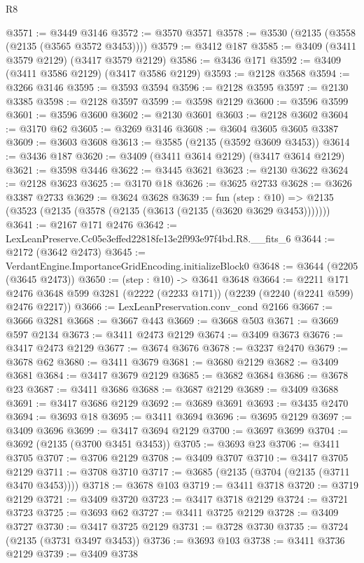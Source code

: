 \begin{lexlean}{R8}
\begin{coremodule}
@3571 := @3449 @3146
@3572 := @3570 @3571
@3578 := @3530 (@2135 (@3558 (@2135 (@3565 @3572 @3453))))
@3579 := @3412 @187
@3585 := @3409 (@3411 @3579 @2129) (@3417 @3579 @2129)
@3586 := @3436 @171
@3592 := @3409 (@3411 @3586 @2129) (@3417 @3586 @2129)
@3593 := @2128 @3568
@3594 := @3266 @3146
@3595 := @3593 @3594
@3596 := @2128 @3595
@3597 := @2130 @3385
@3598 := @2128 @3597
@3599 := @3598 @2129
@3600 := @3596 @3599
@3601 := @3596 @3600
@3602 := @2130 @3601
@3603 := @2128 @3602
@3604 := @3170 @62
@3605 := @3269 @3146
@3608 := @3604 @3605 @3605 @3387
@3609 := @3603 @3608
@3613 := @3585 (@2135 (@3592 @3609 @3453))
@3614 := @3436 @187
@3620 := @3409 (@3411 @3614 @2129) (@3417 @3614 @2129)
@3621 := @3598 @3446
@3622 := @3445 @3621
@3623 := @2130 @3622
@3624 := @2128 @3623
@3625 := @3170 @18
@3626 := @3625 @2733
@3628 := @3626 @3387 @2733
@3629 := @3624 @3628
@3639 := fun (step : @10) =>
  @2135 (@3523 (@2135 (@3578 (@2135 (@3613 (@2135 (@3620 @3629 @3453)))))))
@3641 := @2167 @171 @2476
@3642 := LexLeanPreserve.Cc05e3effed22818fe13e2f993e97f4bd.R8.__fits_6
@3644 := @2172 (@3642 @2473)
@3645 := VerdantEngine.ImportanceGridEncoding.initializeBlock0
@3648 := @3644 (@2205 (@3645 @2473))
@3650 := (step : @10) -> @3641 @3648
@3664 := @2211
    @171
    @2476
    @3648
    @599
    @3281
    (@2222 (@2233 @171))
    (@2239 (@2240 (@2241 @599) @2476 @2217))
@3666 := LexLeanPreservation.conv_cond @2166
@3667 := @3666 @3281
@3668 := @3667 @443
@3669 := @3668 @503
@3671 := @3669 @597 @2134
@3673 := @3411 @2473 @2129
@3674 := @3409 @3673
@3676 := @3417 @2473 @2129
@3677 := @3674 @3676
@3678 := @3237 @2470
@3679 := @3678 @62
@3680 := @3411 @3679
@3681 := @3680 @2129
@3682 := @3409 @3681
@3684 := @3417 @3679 @2129
@3685 := @3682 @3684
@3686 := @3678 @23
@3687 := @3411 @3686
@3688 := @3687 @2129
@3689 := @3409 @3688
@3691 := @3417 @3686 @2129
@3692 := @3689 @3691
@3693 := @3435 @2470
@3694 := @3693 @18
@3695 := @3411 @3694
@3696 := @3695 @2129
@3697 := @3409 @3696
@3699 := @3417 @3694 @2129
@3700 := @3697 @3699
@3704 := @3692 (@2135 (@3700 @3451 @3453))
@3705 := @3693 @23
@3706 := @3411 @3705
@3707 := @3706 @2129
@3708 := @3409 @3707
@3710 := @3417 @3705 @2129
@3711 := @3708 @3710
@3717 := @3685 (@2135 (@3704 (@2135 (@3711 @3470 @3453))))
@3718 := @3678 @103
@3719 := @3411 @3718
@3720 := @3719 @2129
@3721 := @3409 @3720
@3723 := @3417 @3718 @2129
@3724 := @3721 @3723
@3725 := @3693 @62
@3727 := @3411 @3725 @2129
@3728 := @3409 @3727
@3730 := @3417 @3725 @2129
@3731 := @3728 @3730
@3735 := @3724 (@2135 (@3731 @3497 @3453))
@3736 := @3693 @103
@3738 := @3411 @3736 @2129
@3739 := @3409 @3738

\end{coremodule}
\end{lexlean}
